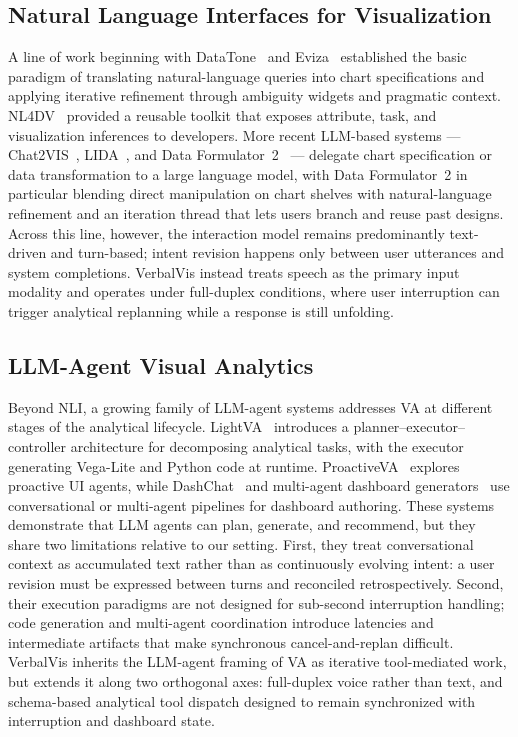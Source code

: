 \documentclass[journal]{IEEEtran}
\begin{document}
\subsection{Natural Language Interfaces for Visualization}
A line of work beginning with DataTone~\cite{gao2015datatone} and Eviza~\cite{setlur2016eviza} established the basic paradigm of translating natural-language queries into chart specifications and applying iterative refinement through ambiguity widgets and pragmatic context. NL4DV~\cite{narechania2020nl4dv} provided a reusable toolkit that exposes attribute, task, and visualization inferences to developers. More recent LLM-based systems --- Chat2VIS~\cite{maddigan2023chat2vis}, LIDA~\cite{dibia2023lida}, and Data Formulator~2~\cite{wang2025dataformulator2} --- delegate chart specification or data transformation to a large language model, with Data Formulator~2 in particular blending direct manipulation on chart shelves with natural-language refinement and an iteration thread that lets users branch and reuse past designs. Across this line, however, the interaction model remains predominantly text-driven and turn-based; intent revision happens only between user utterances and system completions. VerbalVis instead treats speech as the primary input modality and operates under full-duplex conditions, where user interruption can trigger analytical replanning while a response is still unfolding.

\subsection{LLM-Agent Visual Analytics}
Beyond NLI, a growing family of LLM-agent systems addresses VA at different stages of the analytical lifecycle. LightVA~\cite{zhao2024lightva} introduces a planner--executor--controller architecture for decomposing analytical tasks, with the executor generating Vega-Lite and Python code at runtime. ProactiveVA~\cite{he2025proactiveva} explores proactive UI agents, while DashChat~\cite{cheng2025dashchat} and multi-agent dashboard generators~\cite{shen2025datatodashboard} use conversational or multi-agent pipelines for dashboard authoring. These systems demonstrate that LLM agents can plan, generate, and recommend, but they share two limitations relative to our setting. First, they treat conversational context as accumulated text rather than as continuously evolving intent: a user revision must be expressed between turns and reconciled retrospectively. Second, their execution paradigms are not designed for sub-second interruption handling; code generation and multi-agent coordination introduce latencies and intermediate artifacts that make synchronous cancel-and-replan difficult. VerbalVis inherits the LLM-agent framing of VA as iterative tool-mediated work, but extends it along two orthogonal axes: full-duplex voice rather than text, and schema-based analytical tool dispatch designed to remain synchronized with interruption and dashboard state.
\end{document}
